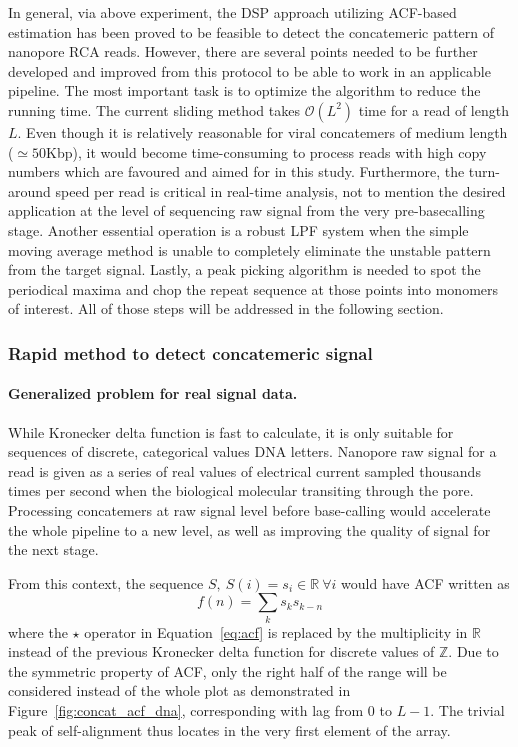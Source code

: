 In general, via above experiment, the DSP approach utilizing ACF-based estimation has been proved to be feasible to detect the concatemeric pattern of nanopore RCA reads.
However, there are several points needed to be further developed and improved from this protocol to be able to work in an applicable pipeline.
The most important task is to optimize the algorithm to reduce the running time. The current sliding method takes $\mathcal{O}(L^2)$ time for a read of length $L$.
Even though it is relatively reasonable for viral concatemers of medium length ($\simeq 50$Kbp), it would become time-consuming to process reads with high copy numbers which are favoured and aimed for in this study.
Furthermore, the turn-around speed per read is critical in real-time analysis, not to mention the desired application at the level of sequencing raw signal from the very pre-basecalling stage.
Another essential operation is a robust LPF system when the simple moving average method is unable to completely eliminate the unstable pattern from the target signal. Lastly, a peak picking algorithm is needed to spot the periodical maxima and chop the repeat sequence at those points into monomers of interest.
All of those steps will be addressed in the following section.

\subsubsection{Rapid method to detect concatemeric signal}
\paragraph{Generalized problem for real signal data.}
While Kronecker delta function is fast to calculate, it is only suitable for sequences of discrete, categorical values \EG{} DNA letters. 
Nanopore raw signal for a read is given as a series of real values of electrical current sampled thousands times per second when the biological molecular transiting through the pore. 
Processing concatemers at raw signal level before base-calling would accelerate the whole pipeline to a new level, as well as improving the quality of signal for the next stage. 

From this context, the sequence $S,\: S(i)=s_i \in \mathbb{R} \: \forall i$ would have ACF written as
\[
 f(n)=\sum_{k}{s_{k}s_{k-n}}   
\]
where the $\star$ operator in Equation~\ref{eq:acf} is replaced by the multiplicity in $\mathbb{R}$ instead of the previous Kronecker delta function for discrete values of $\mathbb{Z}$.
Due to the symmetric property of ACF, only the right half of the range will be considered instead of the whole plot as demonstrated in Figure~\ref{fig:concat_acf_dna}, corresponding with lag from $0$ to $L-1$. The trivial peak of self-alignment thus locates in the very first element of the array.
